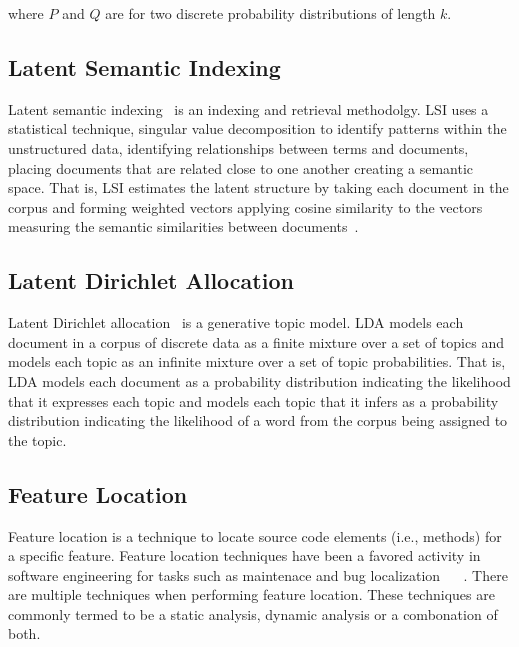 where $P$ and $Q$ are for two discrete probability distributions of length $k$.

\subsection{Latent Semantic Indexing}

Latent semantic indexing~\cite{Deerwester-etal:1990} is an indexing and
retrieval methodolgy. LSI uses a statistical technique, singular value
decomposition to identify patterns within the unstructured data, identifying relationships 
between terms and documents, placing documents that are related close to one another 
creating a semantic space. That is, LSI estimates the latent structure by taking each 
document in the corpus and forming weighted vectors applying cosine similarity to the vectors 
measuring the semantic similarities between documents~\cite{Binkley-Lawrie:2010}.

\subsection{Latent Dirichlet Allocation}

Latent Dirichlet allocation~\cite{Blei-etal:2003} is a generative topic model.
LDA models each document in a corpus of discrete data as a finite mixture over a set of topics
and models each topic as an infinite mixture over a set of topic probabilities.
That is, LDA models each document as a probability distribution
indicating the likelihood that it expresses each topic and
models each topic that it infers as a probability distribution
indicating the likelihood of a word from the corpus being assigned to the topic.


\subsection{Feature Location} Feature location is a technique to locate source
code elements (i.e., methods) for a specific feature. Feature location
techniques have been a favored activity in software engineering for tasks such
as maintenace and bug localization ~\cite{4656405} ~\cite{1374321}. There are
multiple techniques when performing feature location. These techniques are
commonly termed to be a static analysis, dynamic analysis or a combonation of both.
